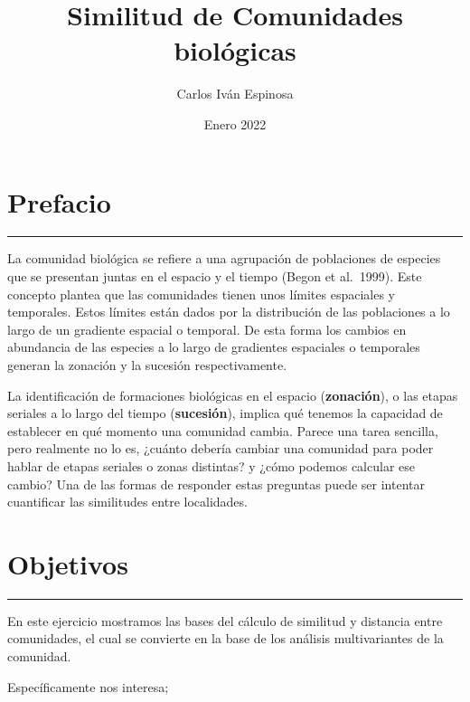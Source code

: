 \documentclass[
]{book}
\title{Similitud de Comunidades biológicas}
\author{Carlos Iván Espinosa}
\date{Enero 2022}
\begin{document}
\maketitle

{
\setcounter{tocdepth}{1}
\tableofcontents
}
\hypertarget{prefacio}{%
\chapter*{Prefacio}\label{prefacio}}

\begin{center}\rule{0.5\linewidth}{0.5pt}\end{center}

La comunidad biológica se refiere a una agrupación de poblaciones de especies que se presentan juntas en el espacio y el tiempo (Begon et al.~1999). Este concepto plantea que las comunidades tienen unos límites espaciales y temporales. Estos límites están dados por la distribución de las poblaciones a lo largo de un gradiente espacial o temporal. De esta forma los cambios en abundancia de las especies a lo largo de gradientes espaciales o temporales generan la zonación y la sucesión respectivamente.

La identificación de formaciones biológicas en el espacio (\textbf{zonación}), o las etapas seriales a lo largo del tiempo (\textbf{sucesión}), implica qué tenemos la capacidad de establecer en qué momento una comunidad cambia. Parece una tarea sencilla, pero realmente no lo es, ¿cuánto debería cambiar una comunidad para poder hablar de etapas seriales o zonas distintas? y ¿cómo podemos calcular ese cambio? Una de las formas de responder estas preguntas puede ser intentar cuantificar las similitudes entre localidades.

\hypertarget{objetivos}{%
\chapter*{Objetivos}\label{objetivos}}

\begin{center}\rule{0.5\linewidth}{0.5pt}\end{center}

En este ejercicio mostramos las bases del cálculo de similitud y distancia entre comunidades, el cual se convierte en la base de los análisis multivariantes de la comunidad.

Específicamente nos interesa;
\end{document}
